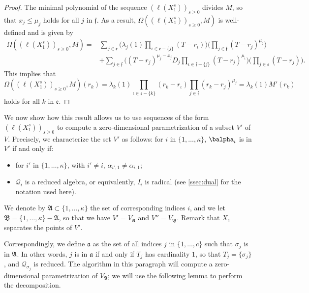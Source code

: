 \documentclass[12pt]{article}
\newcommand{\residueI}{\mathscr{Q}}
\def\dg{\kappa}
\begin{document}
\begin{proof}

        The minimal polynomial of the sequence $(\ell(X_1^s))_{s \ge
          0}$ divides $M$, so that $x_j \le \mu_j$ holds for all $j$
        in $\mathfrak{f}$.  As a result,
        $\Omega((\ell(X_1^s))_{s\ge0},M)$ is well-defined and is given by
	\begin{align*}
	\Omega((\ell(X_1^s))_{s\ge0},M)=&
	\sum_{j \in \mathfrak{e}}
	\Big(
	\lambda_j(1) \prod_{\iota \in \mathfrak{e}-\{j\}}(T-r_\iota)\Big)
	\Big(\prod_{j \in \mathfrak{f}}(T-r_j)^{\mu_j} \Big)\\
	&+
	\sum_{j\in \mathfrak{f}}
	\Big(  (T-r_j)^{\mu_j-x_j} D_j
	\prod_{\iota \in \mathfrak{f}-\{j\}}(T-r_j)^{\mu_\iota}\Big)
	\Big(\prod_{j\in \mathfrak{e}} (T-r_j) \Big).
	\end{align*}
	This implies that $$\Omega((\ell(X_1^s))_{s\ge0},M)(r_k) =\lambda_k(1) 
	\prod_{\iota \in \mathfrak{e}-\{k\}}(r_k-r_\iota)
	\prod_{j \in \mathfrak{f}}(r_k-r_j)^{\mu_j} = \lambda_k(1) M'(r_k)$$ 
	holds for all $k$ in $\mathfrak{e}$.
\end{proof}

We now show how this result allows us to use sequences of the form
$(\ell(X_1^s))_{s \ge 0}$ to compute a zero-dimensional
parametrization of a subset $V'$ of $V$. Precisely, we characterize
the set $V'$ as follows: for $i$ in $\{1,\dots,\dg\}$, $\balpha_i$ is
in $V'$ if and only if:
\begin{itemize}
	\item for $i'$ in $\{1,\dots,\dg\}$, with $i'\ne i$, $\alpha_{i',1} \ne
	\alpha_{i,1}$;
	\item $\residueI_i$ is a reduced algebra, or equivalently, $I_i$ is radical (see \cref{ssec:dual} 
          for the notation used here).
\end{itemize}
We denote by $\mathfrak{A}\subset \{1,\dots,\dg\}$ the set of
corresponding indices $i$, and we let
$\mathfrak{B}=\{1,\dots,\dg\}-\mathfrak{A}$, so that we have
$V'=V_{\mathfrak{A}}$ and $V''=V_{\mathfrak{B}}$.  Remark that $X_1$
separates the points of $V'$.

Correspondingly, we define $\mathfrak{a}$ as the set of all indices
$j$ in $\{1,\dots,c\}$ such that $\sigma_j$ is in $\mathfrak{A}$. In
other words, $j$ is in $\mathfrak{a}$ if and only if $T_j$ has
cardinality $1$, so that $T_j=\{\sigma_j\}$, and
$\residueI_{\sigma_j}$ is reduced.  The algorithm in this paragraph
will compute a zero-dimensional parametrization of $V_{\mathfrak{A}}$;
we will use the following lemma to perform the decomposition.
\end{document}
